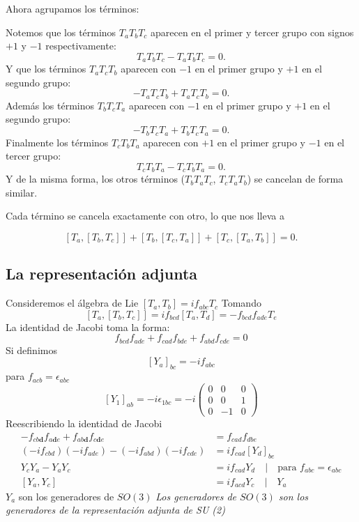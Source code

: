 \documentclass[a4paper,12pt]{article}
\begin{document}
{\begin{minipage}{0.9\textwidth}
Ahora agrupamos los términos:

Notemos que los términos \(T_aT_bT_c\) aparecen en el primer y tercer grupo con signos \(+1\) y \(-1\) respectivamente:
  \[
  T_aT_bT_c - T_aT_bT_c = 0.
  \]
Y que los términos \(T_aT_cT_b\) aparecen con \(-1\) en el primer grupo y \(+1\) en el segundo grupo:
  \[
  -T_aT_cT_b + T_aT_cT_b = 0.
  \]
Además los términos \(T_bT_cT_a\) aparecen con \(-1\) en el primer grupo y \(+1\) en el segundo grupo:
  \[
  -T_bT_cT_a + T_bT_cT_a = 0.
  \]
Finalmente los términos \(T_cT_bT_a\) aparecen con \(+1\) en el primer grupo y \(-1\) en el tercer grupo:
  \[
  T_cT_bT_a - T_cT_bT_a = 0.
  \]
Y de la misma forma, los otros términos (\(T_bT_aT_c\), \(T_cT_aT_b\)) se cancelan de forma similar.

Cada término se cancela exactamente con otro, lo que nos lleva a

\[
[T_a, [T_b, T_c]] + [T_b, [T_c, T_a]] + [T_c, [T_a, T_b]] = 0.
\]

 \end{minipage}
}
 \subsection{ La representación adjunta}
Consideremos el álgebra de Lie $[T_a, T_b ] = if_{abc} T_c $ 
Tomando 
\[
[T_a, [T_b,T_c ]] = i f_{bcd } [T_a, T_d] = -f_{bcd }f_{ade} T_e
\]
La identidad de Jacobi toma la forma: 
\[
f_{bcd }f_{ade} +f_{cad }f_{bde}+ f_{abd}f_{cde}=0
\]
Si definimos 
\[
[Y_a ]_{bc } = - i f_{abc} 
\]
para $f_{acb} = \epsilon_{abc}$ 
\[
[Y_1 ]_{ab} = - i \epsilon_{1bc} = - i \begin{pmatrix}
    0&0&0\\0&0&1\\0&-1&0
\end{pmatrix}
\]
Reescribiendo la identidad de Jacobi 
\begin{align*}
    -f_{cb\textbf{d}} f_{a\textbf{d} e} + f_{ab \textbf{d} }f_{c\textbf{d}e }&= f_{cad } f_{dbe}\\
    (-i f_{cbd}) (- if_{ade} )-(-i f_{abd})(- i f_{cde})  &= if_{cad} [Y_d]_{be} \\
    Y_cY_a -Y_aY_c &= i f_{cad } Y_{d} \quad | \quad \text{para  } f_{abc } = \epsilon_{abc} \\
    [Y_a,Y_c] &= i f_{acd }Y_c \quad | \quad Y_a 
\end{align*}
$Y_a$ son los generadores de $SO(3)$
\textit{Los generadores de  $SO(3)$ son los generadores de la representación adjunta de SU (2)  } 
\end{document}
